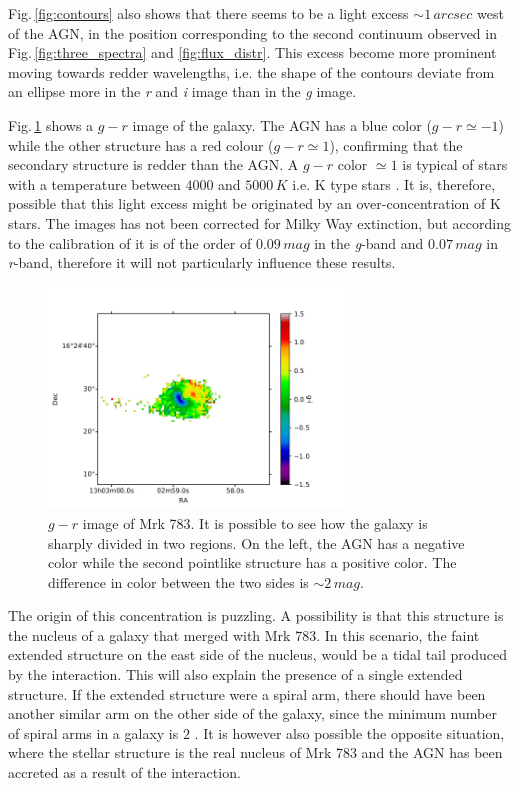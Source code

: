 \documentclass[../thesis.tex]{subfiles}
\begin{document}
Fig.\,\ref{fig:contours} also shows that there seems to be a light excess $\sim 1\,\si{arcsec}$ west of the AGN, in the position corresponding to the second continuum observed in Fig.\,\ref{fig:three_spectra} and \ref{fig:flux_distr}.
This excess become more prominent moving towards redder wavelengths, i.e. the shape of the contours deviate from an ellipse more in the \emph{r} and \emph{i} image than in the \emph{g} image.

Fig.\,\ref{fig:mrk_gr} shows a $g-r$ image of the galaxy.
The AGN has a blue color ($g-r \simeq -1$) while the other structure has a red colour ($g-r\simeq 1$), confirming that the secondary structure is redder than the AGN.
A $g-r$ color $\simeq 1$ is typical of stars with a temperature between $4000$ and $5000\,\si{K}$ i.e. K type stars \citep{Fukugita11}.
It is, therefore, possible that this light excess might be originated by an over-concentration of K stars.
The images has not been corrected for Milky Way extinction, but according to the calibration of \citet{Schlafly11} it is of the order of $0.09\,\si{mag}$ in the \emph{g}-band and $0.07\,\si{mag}$ in \emph{r}-band, therefore it will not particularly influence these results.

\begin{figure}
\centering
\includegraphics[width=0.7\textwidth]{images/paper3/mrk783color.jpg} 
\caption[]{$g-r$ image of Mrk 783. It is possible to see how the galaxy is sharply divided in two regions. On the left, the AGN has a negative color while the second pointlike structure has a positive color. The difference in color between the two sides is $\sim 2\,\si{mag}$.} 
\label{fig:mrk_gr}
\end{figure} 

The origin of this concentration is puzzling.
A possibility is that this structure is the nucleus of a galaxy that merged with Mrk 783. 
In this scenario, the faint extended structure on the east side of the nucleus, would be a tidal tail produced by the interaction.
This will also explain the presence of a single extended structure.
If the extended structure were a spiral arm, there should have been another similar arm on the other side of the galaxy, since the minimum number of spiral arms in a galaxy is $2$ \citep{Donghia15}.
It is however also possible the opposite situation, where the stellar structure is the real nucleus of Mrk 783 and the AGN has been accreted as a result of the interaction.
\end{document}
